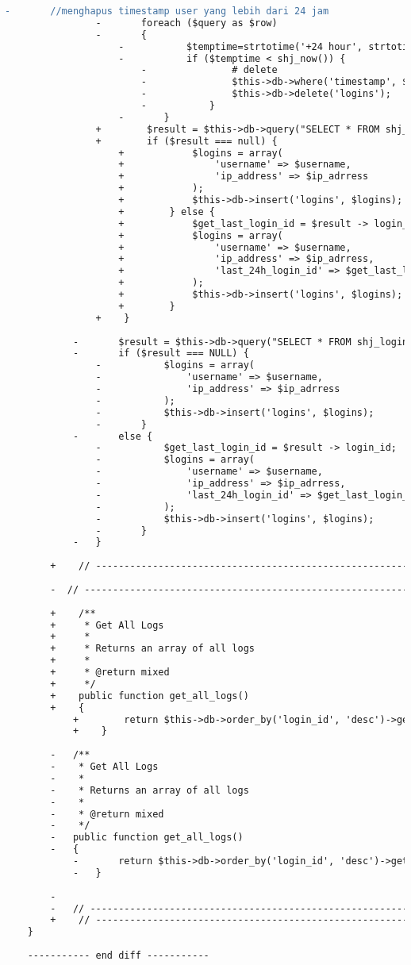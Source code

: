 \begin{lstlisting}[language=diff, caption=Perubahan pada kode Logs\_model.php]
				-		//menghapus timestamp user yang lebih dari 24 jam
				-		foreach ($query as $row)
				-		{
					-			$temptime=strtotime('+24 hour', strtotime($row['timestamp']));
					-			if ($temptime < shj_now()) {
						-				# delete
						-				$this->db->where('timestamp', $row['timestamp']);
						-				$this->db->delete('logins');
						-			}
					-		}
				+        $result = $this->db->query("SELECT * FROM shj_logins WHERE username='".$username."' AND ip_address!='".$ip_adrress."' ORDER BY timestamp DESC")->row();
				+        if ($result === null) {
					+            $logins = array(
					+                'username' => $username,
					+                'ip_address' => $ip_adrress
					+            );
					+            $this->db->insert('logins', $logins);
					+        } else {
					+            $get_last_login_id = $result -> login_id;
					+            $logins = array(
					+                'username' => $username,
					+                'ip_address' => $ip_adrress,
					+                'last_24h_login_id' => $get_last_login_id
					+            );
					+            $this->db->insert('logins', $logins);
					+        }
				+    }
			
			-		$result = $this->db->query("SELECT * FROM shj_logins WHERE username='".$username."' AND ip_address!='".$ip_adrress."' ORDER BY timestamp DESC")->row();
			-		if ($result === NULL) {
				-			$logins = array(
				-				'username' => $username,
				-				'ip_address' => $ip_adrress
				-			);
				-			$this->db->insert('logins', $logins);
				-		}
			-		else {
				-			$get_last_login_id = $result -> login_id;
				-			$logins = array(
				-				'username' => $username,
				-				'ip_address' => $ip_adrress,
				-				'last_24h_login_id' => $get_last_login_id
				-			);
				-			$this->db->insert('logins', $logins);
				-		}
			-	}
		
		+    // ------------------------------------------------------------------------
		
		-  // ------------------------------------------------------------------------
		
		+    /**
		+     * Get All Logs
		+     *
		+     * Returns an array of all logs
		+     *
		+     * @return mixed
		+     */
		+    public function get_all_logs()
		+    {
			+        return $this->db->order_by('login_id', 'desc')->get('logins')->result_array();
			+    }
		
		-	/**
		-	 * Get All Logs
		-	 *
		-	 * Returns an array of all logs
		-	 *
		-	 * @return mixed
		-	 */
		-	public function get_all_logs()
		-	{
			-		return $this->db->order_by('login_id', 'desc')->get('logins')->result_array();
			-	}
		
		-
		-	// ------------------------------------------------------------------------
		+    // ------------------------------------------------------------------------
	}
	
	----------- end diff -----------
\end{lstlisting}

